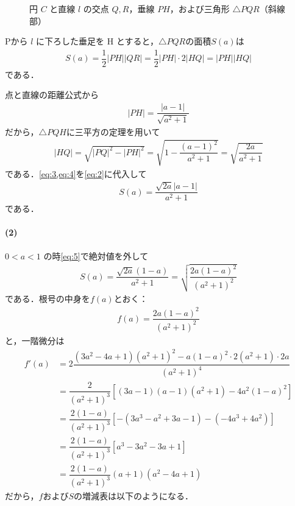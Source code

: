 \documentclass[../../main.tex]{subfiles}
\begin{document}
\begin{figure}[htb]
  \caption{円 $C$ と直線 $l$ の交点 $Q, R$，垂線 $PH$，および三角形 $\triangle PQR$（斜線部）}
  \label{fig:triangle_pqr_area}
\end{figure}

Pから $l$ に下ろした垂足を H とすると，$\triangle PQR$の面積$S(a)$は
\begin{align}
  S(a)
  = \dfrac{1}{2} |PH||QR|
  = \dfrac{1}{2} |PH|\cdot 2|HQ|
  = |PH||HQ| \label{eq:2}
\end{align}
である．

点と直線の距離公式から
\begin{align}
  |PH| = \dfrac{|a-1|}{\sqrt{a^2+1}} \label{eq:3}
\end{align}
だから，$\triangle PQH$に三平方の定理を用いて
\begin{align}
  |HQ| = \sqrt{|PQ|^2-|PH|^2} = \sqrt{1 - \dfrac{(a-1)^2}{a^2+1}} = \sqrt{\dfrac{2a}{a^2+1}} \label{eq:4}
\end{align}
である．\cref{eq:3,eq:4}を\cref{eq:2}に代入して
\begin{align}
  S(a) = \dfrac{\sqrt{2a}|a-1|}{a^2+1} \label{eq:5}
\end{align}
である．

\paragraph{(2)}

$0 < a < 1$ の時\cref{eq:5}で絶対値を外して
\begin{align}
  S(a) = \dfrac{\sqrt{2a}(1-a)}{a^2+1} = \sqrt{\dfrac{2a(1-a)^2}{(a^2+1)^2}}
\end{align}
である．根号の中身を$f(a)$とおく：
\begin{align}
  f(a) = \dfrac{2a(1-a)^2}{(a^2+1)^2}
\end{align}
と，一階微分は
\begin{align}
  f'(a)
  &= 2 \dfrac{ (3a^2-4a+1)(a^2+1)^2 - a(1-a)^2 \cdot 2(a^2+1) \cdot 2a }{(a^2+1)^4} \\
  &= \dfrac{2}{(a^2+1)^3} \left[ (3a-1)(a-1)(a^2+1) - 4a^2(1-a)^2 \right] \\
  &= \dfrac{2(1-a)}{(a^2+1)^3} \left[ -(3a^3-a^2+3a-1) - (-4a^3+4a^2) \right] \\
  &= \dfrac{2(1-a)}{(a^2+1)^3} \left[ a^3-3a^2-3a+1 \right] \\
  &= \dfrac{2(1-a)}{(a^2+1)^3} (a+1) (a^2-4a+1)
\end{align}
だから，$f$および$S$の増減表は以下のようになる．
\end{document}
